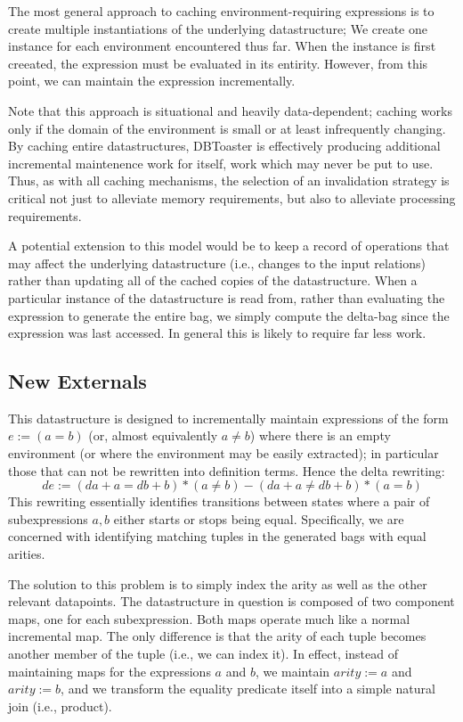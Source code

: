 \documentclass[11pt]{amsart}
\newcommand{\parsection}[1]{\smallskip\noindent{\bf #1.}}
\begin{document}
The most general approach to caching environment-requiring expressions is to create multiple instantiations of the underlying datastructure; We create one instance for each environment encountered thus far.  When the instance is first creeated, the expression must be evaluated in its entirity.  However, from this point, we can maintain the expression incrementally.  

Note that this approach is situational and heavily data-dependent; caching works only if the domain of the environment is small or at least infrequently changing.  By caching entire datastructures, DBToaster is effectively producing additional incremental maintenence work for itself, work which may never be put to use.  Thus, as with all caching mechanisms, the selection of an invalidation strategy is critical not just to alleviate memory requirements, but also to alleviate processing requirements.  

A potential extension to this model would be to keep a record of operations that may affect the underlying datastructure (i.e., changes to the input relations) rather than updating all of the cached copies of the datastructure.  When a particular instance of the datastructure is read from, rather than evaluating the expression to generate the entire bag,  we simply compute the delta-bag since the expression was last accessed.  In general this is likely to require far less work.

\parsection{Bigsum Rewriting}

\subsection{New Externals} 

\parsection{Incremental Equimap}
This datastructure is designed to incrementally maintain expressions of the form $e := (a = b)$ (or, almost equivalently $a \neq b$) where there is an empty environment (or where the environment may be easily extracted); in particular those that can not be rewritten into definition terms.  Hence the delta rewriting:
$$de := (da+a = db+b)*(a \neq b) - (da+a \neq db+b)*(a = b)$$
This rewriting essentially identifies transitions between states where a pair of subexpressions $a, b$ either starts or stops being equal.  Specifically, we are concerned with identifying matching tuples in the generated bags with equal arities.

The solution to this problem is to simply index the arity as well as the other relevant datapoints.  The datastructure in question is composed of two component maps, one for each subexpression.  Both maps operate much like a normal incremental map.  The only difference is that the arity of each tuple becomes another member of the tuple (i.e., we can index it).  In effect, instead of maintaining maps for the expressions $a$ and $b$, we maintain $arity := a$ and $arity := b$, and we transform the equality predicate itself into a simple natural join (i.e., product).  
\end{document}
